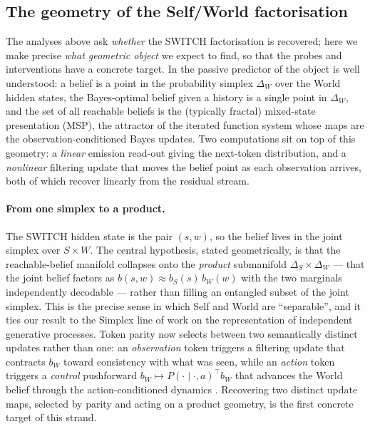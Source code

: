 
\subsection*{The geometry of the Self/World factorisation}

The analyses above ask \emph{whether} the SWITCH factorisation is recovered; here we
make precise \emph{what geometric object} we expect to find, so that the probes and
interventions have a concrete target. In the passive predictor of
\citep{shai2024belief} the object is well understood: a belief is a point in the
probability simplex $\Delta_W$ over the World hidden states, the Bayes-optimal belief
given a history is a single point in $\Delta_W$, and the set of all reachable beliefs
is the (typically fractal) mixed-state presentation (MSP), the attractor of the
iterated function system whose maps are the observation-conditioned Bayes updates. Two
computations sit on top of this geometry: a \emph{linear} emission read-out giving the
next-token distribution, and a \emph{nonlinear} filtering update that moves the belief
point as each observation arrives, both of which \citep{shai2024belief} recover
linearly from the residual stream.

\paragraph{From one simplex to a product.} The SWITCH hidden state is the pair $(s,w)$,
so the belief lives in the joint simplex over $S\times W$. The central hypothesis,
stated geometrically, is that the reachable-belief manifold collapses onto the
\emph{product} submanifold $\Delta_S\times\Delta_W$ --- that the joint belief factors as
$b(s,w)\approx b_S(s)\,b_W(w)$ with the two marginals independently decodable --- rather
than filling an entangled subset of the joint simplex. This is the precise sense in
which Self and World are ``separable'', and it ties our result to the Simplex line of
work on the representation of independent generative processes. Token parity now selects
between two semantically distinct updates rather than one: an \emph{observation} token
triggers a filtering update that contracts $b_W$ toward consistency with what was seen,
while an \emph{action} token triggers a \emph{control} pushforward
$b_W \mapsto P(\cdot\mid\cdot,a)^{\top} b_W$ that advances the World belief through the
action-conditioned dynamics \citep{bengio1995iohmm}. Recovering two distinct update
maps, selected by parity and acting on a product geometry, is the first concrete target
of this strand.

